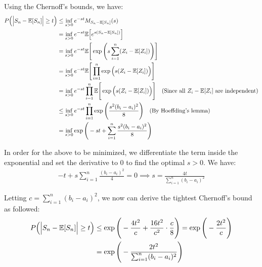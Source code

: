 \begin{proof*}
    Using the Chernoff's bounds, we have:
    \begin{align*}
        P\Big( \Big| S_n - \mathbb{E}[S_n] \Big| \ge t \Big)
            &\le \inf_{s>0} e^{-st}M_{S_n - \mathbb{E}[S_n]}(s) \\
            &= \inf_{s>0}e^{-st}\mathbb{E}\Big[ 
                e^{s(S_n - \mathbb{E}[S_n])}
             \Big] \\
            &= \inf_{s>0}e^{-st}\mathbb{E}\Bigg[ 
                \exp\Bigg( 
                    s\sum_{i=1}^n (Z_i - \mathbb{E}[Z_i])
                 \Bigg)
             \Bigg] \\
            &= \inf_{s>0}e^{-st}\mathbb{E}\Bigg[ 
                \prod_{i=1}^n \exp\Big( s( Z_i - \mathbb{E}[Z_i])  \Big)
             \Bigg] \\
            &= \inf_{s>0}e^{-st} \prod_{i=1}^n \mathbb{E}\Bigg[ 
                \exp\Big( s( Z_i - \mathbb{E}[Z_i])  \Big)
             \Bigg] \ \ \ (\text{Since all $Z_i - \mathbb{E}[Z_i]$ are independent}) \\
            &\le \inf_{s>0}e^{-st} \prod_{i=1}^n \exp\Bigg( 
                \frac{s^2(b_i - a_i)^2}{8}
             \Bigg) \ \ \ (\text{By Hoeffding's lemma}) \\
            &= \inf_{s>0} \exp\Bigg( 
                -st + \sum_{i=1}^n \frac{s^2(b_i - a_i)^2}{8}
             \Bigg)
    \end{align*}

    \noindent In order for the above to be minimized, we differentiate the term inside the exponential and set the derivative to $0$ to find the optimal $s>0$. We have:
    \begin{align*}
        -t + s\sum_{i=1}^n \frac{(b_i-a_i)^2}{4} = 0 \implies s = \frac{4t}{\sum_{i=1}^n(b_i - a_i)^2}
    \end{align*}

    \noindent Letting $c = \sum_{i=1}^n(b_i-a_i)^2$, we now can derive the tightest Chernoff's bound as followed:
    \begin{align*}
        P\Big( \Big| S_n - \mathbb{E}[S_n] \Big| \ge t \Big)
            &\le \exp\Bigg( 
                -\frac{4t^2}{c} + \frac{16t^2}{c^2} \cdot \frac{c}{8}
             \Bigg) = \exp\Bigg( 
                -\frac{2t^2}{c}
             \Bigg) \\
            &= \exp\Bigg( 
                -\frac{2t^2}{\sum_{i=1}^n(b_i - a_i)^2}
             \Bigg)
    \end{align*}
\end{proof*}


